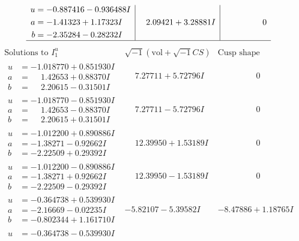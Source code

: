 \documentclass[1p]{elsarticle_modified}
\theoremstyle{definition}
\newcommand{\I}{\sqrt{-1}}
\begin{document}
$$\begin{array}{c|c|c}
\begin{aligned}
u &= -0.887416 - 0.936488 I \\
a &= -1.41323 + 1.17323 I \\
b &= -2.35284 - 0.28232 I\end{aligned}
 & \phantom{-}2.09421 + 3.28881 I & \phantom{-0.000000 } 0\\
 \hline 
 \end{array}$$\newpage$$\begin{array}{c|c|c}  
\text{Solutions to }I^u_{1}& \I (\text{vol} + \sqrt{-1}CS) & \text{Cusp shape}\\
 \hline 
\begin{aligned}
u &= -1.018770 + 0.851930 I \\
a &= \phantom{-}1.42653 + 0.88370 I \\
b &= \phantom{-}2.20615 - 0.31501 I\end{aligned}
 & \phantom{-}7.27711 + 5.72796 I & \phantom{-0.000000 } 0 \\ \hline\begin{aligned}
u &= -1.018770 - 0.851930 I \\
a &= \phantom{-}1.42653 - 0.88370 I \\
b &= \phantom{-}2.20615 + 0.31501 I\end{aligned}
 & \phantom{-}7.27711 - 5.72796 I & \phantom{-0.000000 } 0 \\ \hline\begin{aligned}
u &= -1.012200 + 0.890886 I \\
a &= -1.38271 - 0.92662 I \\
b &= -2.22509 + 0.29392 I\end{aligned}
 & \phantom{-}12.39950 + 1.53189 I & \phantom{-0.000000 } 0 \\ \hline\begin{aligned}
u &= -1.012200 - 0.890886 I \\
a &= -1.38271 + 0.92662 I \\
b &= -2.22509 - 0.29392 I\end{aligned}
 & \phantom{-}12.39950 - 1.53189 I & \phantom{-0.000000 } 0 \\ \hline\begin{aligned}
u &= -0.364738 + 0.539930 I \\
a &= -2.16669 - 0.02235 I \\
b &= -0.802344 + 1.161710 I\end{aligned}
 & -5.82107 - 5.39582 I & -8.47886 + 1.18765 I \\ \hline\begin{aligned}
u &= -0.364738 - 0.539930 I \\

\end{aligned}
\end{array}$$
\end{document}
